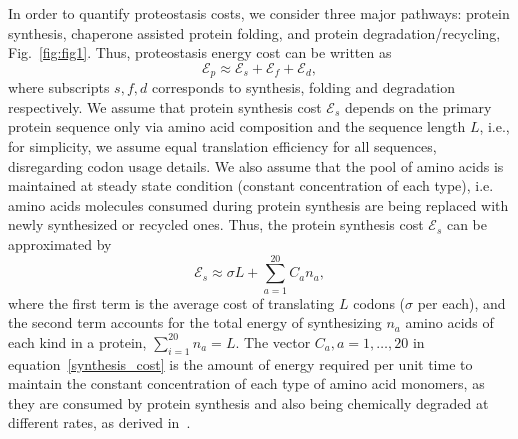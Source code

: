 \documentclass[10pt,letterpaper]{article}
\begin{document}
In order to quantify proteostasis costs, we consider three major pathways: protein synthesis, chaperone assisted protein folding, and protein degradation/recycling,  Fig.~\ref{fig:fig1}. Thus, proteostasis energy cost can be written as
\begin{equation}
	\label{proteostasis_cost_expansion}
	\mathcal{E}_{p} \approx \mathcal{E}_{s} + \mathcal{E}_{f} + \mathcal{E}_{d},
\end{equation}
where subscripts $s,f,d$ corresponds to synthesis, folding and degradation respectively. We assume that protein synthesis cost $\mathcal{E}_{s}$ depends on the primary protein sequence only via amino acid composition and the sequence length $L$, i.e., for simplicity, we assume equal translation efficiency for all sequences, disregarding codon usage details. We also assume that the pool of amino acids is maintained at steady state condition (constant concentration of each type), i.e. amino acids molecules consumed during protein synthesis are being replaced with newly synthesized or recycled ones. Thus, the protein synthesis cost $\mathcal{E}_{s}$ can be approximated by
\begin{equation}
	\label{synthesis_cost}
	\mathcal{E}_{s} \approx \sigma L + \sum\limits_{a=1}^{20}C_{a}n_{a},
\end{equation}
where the first term is the average cost of  translating $L$ codons ($\sigma$ per each), and the second term accounts for the total energy of synthesizing $n_{a}$ amino acids of each kind in a protein,
 $\sum\limits_{i=1}^{20}n_{a} = L$. The vector $C_{a}, a=1,\dots,20$ in equation~\eqref{synthesis_cost} is the amount of energy required per unit time to maintain the constant concentration of each type of amino acid monomers, as they are consumed by protein synthesis and also being chemically degraded at  different rates, as derived in~\cite{Krick2014Amino}. 
 
\end{document}
